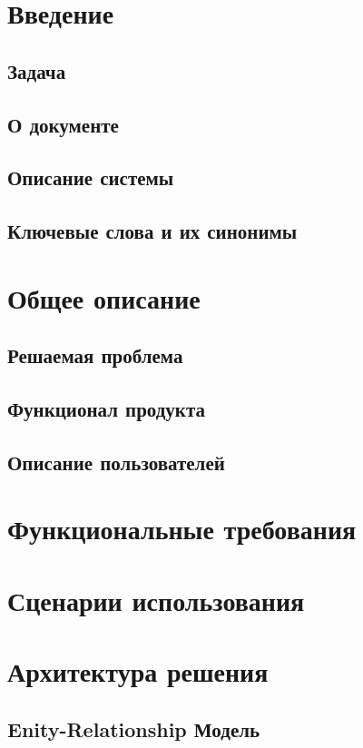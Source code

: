 \documentclass[12pt]{article}
\begin{document}


\tableofcontents

\section{Введение}

\subsection{Задача}


\subsection{О документе}


\subsection{Описание системы}


\subsection{Ключевые слова и их синонимы}


\section{Общее описание}

\subsection{Решаемая проблема}


\subsection{Функционал продукта}


\subsection{Описание пользователей}


\section{Функциональные требования}


\section{Сценарии использования}





\section{Архитектура решения}

\subsection{Enity-Relationship Модель}

\end{document}

